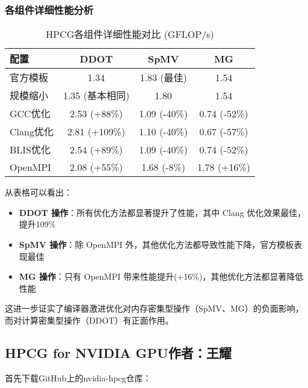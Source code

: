 \documentclass[a4paper,12pt,scheme=plain]{ctexart}
\numberwithin{equation}{section} %
\begin{document}
\subsubsection{各组件详细性能分析}

\begin{table}[h]
    \renewcommand{\arraystretch}{1.5}
    \centering
    \caption{HPCG各组件详细性能对比 (GFLOP/s)}
    \begin{tabular}{|l|c|c|c|}
    \hline
    \textbf{配置} & \textbf{DDOT} & \textbf{SpMV} & \textbf{MG} \\
    \hline
    官方模板 & 1.34 & \textcolor{green!60!black}{1.83 (最佳)} & 1.54 \\
    \hline
    规模缩小 & 1.35 (基本相同) & 1.80 & 1.54 \\
    \hline
    GCC优化 & 2.53 (+88\%) & 1.09 (-40\%) & 0.74 (-52\%) \\
    \hline
    Clang优化 & \textcolor{green!60!black}{2.81 (+109\%)} & 1.10 (-40\%) & 0.67 (-57\%) \\
    \hline
    BLIS优化 & 2.54 (+89\%) & 1.09 (-40\%) & 0.74 (-52\%) \\
    \hline
    OpenMPI & 2.08 (+55\%) & 1.68 (-8\%) & \textcolor{green!60!black}{1.78 (+16\%)} \\
    \hline
    \end{tabular}
\end{table}

从表格可以看出：

\begin{itemize}
    \item \textbf{DDOT 操作}：所有优化方法都显著提升了性能，其中 Clang 优化效果最佳，提升109\%
    \item \textbf{SpMV 操作}：除 OpenMPI 外，其他优化方法都导致性能下降，官方模板表现最佳
    \item \textbf{MG 操作}：只有 OpenMPI 带来性能提升(+16\%)，其他优化方法都显著降低性能
\end{itemize}

这进一步证实了编译器激进优化对内存密集型操作（SpMV、MG）的负面影响，而对计算密集型操作（DDOT）有正面作用。

\subsection[HPCG for NVIDIA GPU]{HPCG for NVIDIA GPU\hfill\textnormal{\small \color{gray}作者：王耀}}

首先下载GitHub上的nvidia-hpcg仓库：
\end{document}
